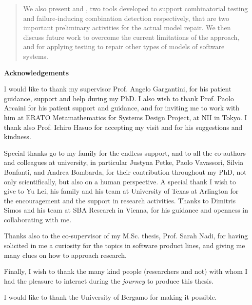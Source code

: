 \begin{abstract}
We also present \ctwedge and \mix, two tools developed to support combinatorial testing and failure-inducing combination detection respectively, that are two important preliminary activities for the actual model repair.
We then discuss future work to overcome the current limitations of the approach, and for applying testing to repair other types of models of software systems.
\end{abstract}

\newenvironment{acknowledgements}%
{\clearpage\thispagestyle{empty}\null\vfill\begin{center}%
		\bfseries Acknowledgements\end{center}}%
{\vfill\null}
\begin{acknowledgements}
	I would like to thank my supervisor Prof. Angelo Gargantini, for his patient guidance, support and help during my PhD. 
	I also wish to thank Prof. Paolo Arcaini for his patient support and guidance, and for inviting me to work with him at ERATO Metamathematics for Systems Design Project, at NII in Tokyo. I thank also Prof. Ichiro Hasuo for accepting my visit and for his suggestions and kindness.

	Special thanks go to my family for the endless support, and to all the co-authors and colleagues at university, in particular Justyna Petke, Paolo Vavassori, Silvia Bonfanti, and Andrea Bombarda, for their contribution throughout my PhD, not only scientifically, but also on a human perspective.
	A special thank I wish to give to Yu Lei, his family and his team at University of Texas at Arlington for the encouragement and the support in research activities.
	Thanks to Dimitris Simos and his team at SBA Research in Vienna, for his guidance and openness in collaborating with me.
	
	Thanks also to the co-supervisor of my M.Sc. thesis, Prof. Sarah Nadi, for having solicited in me a curiosity for the topics in software product lines, and giving me many clues on how to approach research.
	
	Finally, I wish to thank the many kind people (researchers and not) with whom I had the pleasure to interact during the \textit{journey} to produce this thesis.
	
	I would like to thank the University of Bergamo for making it possible.
\end{acknowledgements}

